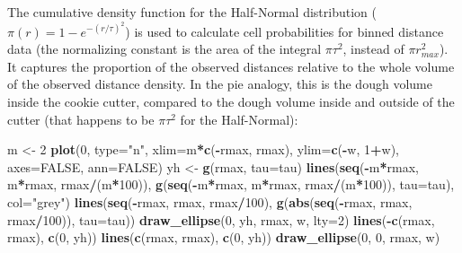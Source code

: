 \documentclass[12pt,]{book}
\newenvironment{Shaded}{\begin{snugshade}}{\end{snugshade}}
\newcommand{\DataTypeTok}[1]{\textcolor[rgb]{0.13,0.29,0.53}{#1}}
\newcommand{\DecValTok}[1]{\textcolor[rgb]{0.00,0.00,0.81}{#1}}
\newcommand{\KeywordTok}[1]{\textcolor[rgb]{0.13,0.29,0.53}{\textbf{#1}}}
\newcommand{\NormalTok}[1]{#1}
\newcommand{\OperatorTok}[1]{\textcolor[rgb]{0.81,0.36,0.00}{\textbf{#1}}}
\newcommand{\OtherTok}[1]{\textcolor[rgb]{0.56,0.35,0.01}{#1}}
\newcommand{\StringTok}[1]{\textcolor[rgb]{0.31,0.60,0.02}{#1}}
\begin{document}
The cumulative density function for the Half-Normal
distribution (\(\pi(r) = 1-e^{-(r/\tau)^2}\)) is used to calculate
cell probabilities for binned distance data
(the normalizing constant is the area of the integral \(\pi \tau^2\),
instead of \(\pi r_{max}^2\)).
It captures the proportion of the observed distances
relative to the whole volume of the observed distance density.
In the pie analogy, this is the dough volume inside
the cookie cutter, compared to the dough volume inside and outside
of the cutter (that happens to be \(\pi \tau^2\) for the Half-Normal):

\begin{Shaded}
\begin{Highlighting}[]
\NormalTok{m <-}\StringTok{ }\DecValTok{2}
\KeywordTok{plot}\NormalTok{(}\DecValTok{0}\NormalTok{, }\DataTypeTok{type=}\StringTok{"n"}\NormalTok{, }\DataTypeTok{xlim=}\NormalTok{m}\OperatorTok{*}\KeywordTok{c}\NormalTok{(}\OperatorTok{-}\NormalTok{rmax, rmax), }\DataTypeTok{ylim=}\KeywordTok{c}\NormalTok{(}\OperatorTok{-}\NormalTok{w, }\DecValTok{1}\OperatorTok{+}\NormalTok{w), }
  \DataTypeTok{axes=}\OtherTok{FALSE}\NormalTok{, }\DataTypeTok{ann=}\OtherTok{FALSE}\NormalTok{)}
\NormalTok{yh <-}\StringTok{ }\KeywordTok{g}\NormalTok{(rmax, }\DataTypeTok{tau=}\NormalTok{tau)}
\KeywordTok{lines}\NormalTok{(}\KeywordTok{seq}\NormalTok{(}\OperatorTok{-}\NormalTok{m}\OperatorTok{*}\NormalTok{rmax, m}\OperatorTok{*}\NormalTok{rmax, rmax}\OperatorTok{/}\NormalTok{(m}\OperatorTok{*}\DecValTok{100}\NormalTok{)),}
  \KeywordTok{g}\NormalTok{(}\KeywordTok{seq}\NormalTok{(}\OperatorTok{-}\NormalTok{m}\OperatorTok{*}\NormalTok{rmax, m}\OperatorTok{*}\NormalTok{rmax, rmax}\OperatorTok{/}\NormalTok{(m}\OperatorTok{*}\DecValTok{100}\NormalTok{)), }\DataTypeTok{tau=}\NormalTok{tau),}
  \DataTypeTok{col=}\StringTok{"grey"}\NormalTok{)}
\KeywordTok{lines}\NormalTok{(}\KeywordTok{seq}\NormalTok{(}\OperatorTok{-}\NormalTok{rmax, rmax, rmax}\OperatorTok{/}\DecValTok{100}\NormalTok{),}
  \KeywordTok{g}\NormalTok{(}\KeywordTok{abs}\NormalTok{(}\KeywordTok{seq}\NormalTok{(}\OperatorTok{-}\NormalTok{rmax, rmax, rmax}\OperatorTok{/}\DecValTok{100}\NormalTok{)), }\DataTypeTok{tau=}\NormalTok{tau))}
\KeywordTok{draw_ellipse}\NormalTok{(}\DecValTok{0}\NormalTok{, yh, rmax, w, }\DataTypeTok{lty=}\DecValTok{2}\NormalTok{)}
\KeywordTok{lines}\NormalTok{(}\OperatorTok{-}\KeywordTok{c}\NormalTok{(rmax, rmax), }\KeywordTok{c}\NormalTok{(}\DecValTok{0}\NormalTok{, yh))}
\KeywordTok{lines}\NormalTok{(}\KeywordTok{c}\NormalTok{(rmax, rmax), }\KeywordTok{c}\NormalTok{(}\DecValTok{0}\NormalTok{, yh))}
\KeywordTok{draw_ellipse}\NormalTok{(}\DecValTok{0}\NormalTok{, }\DecValTok{0}\NormalTok{, rmax, w)}
\end{Highlighting}
\end{Shaded}
\end{document}
